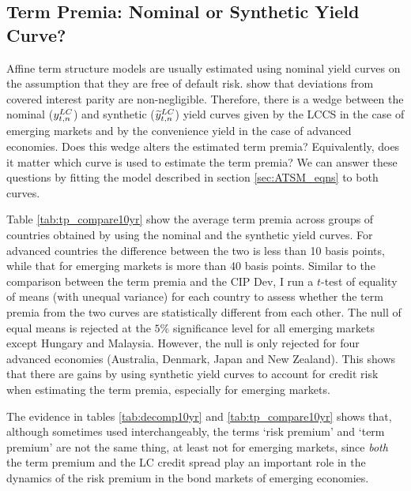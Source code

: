 \subsection{Term Premia: Nominal or Synthetic Yield Curve?}
Affine term structure models are usually estimated using nominal yield curves on the assumption that they are free of default risk. \cite{DuTepperVerdelhan:2018} show that deviations from covered interest parity are non-negligible. Therefore, there is a wedge between the nominal ($y_{t,n} ^{LC}$) and synthetic ($\widetilde{y}_{t,n} ^{LC}$) yield curves given by the LCCS in the case of emerging markets and by the convenience yield in the case of advanced economies. Does this wedge alters the estimated term premia? Equivalently, does it matter which curve is used to estimate the term premia? We can answer these questions by fitting the model described in section \ref{sec:ATSM_eqns} to both curves.

Table \ref{tab:tp_compare10yr} show the average term premia across groups of countries obtained by using the nominal and the synthetic yield curves. For advanced countries the difference between the two is less than 10 basis points, while that for emerging markets is more than 40 basis points. Similar to the comparison between the term premia and the CIP Dev, I run a $t$-test of equality of means (with unequal variance) for each country to assess whether the term premia from the two curves are statistically different from each other. The null of equal means is rejected at the $5$\% significance level for all emerging markets except Hungary and Malaysia. However, the null is only rejected for four advanced economies (Australia, Denmark, Japan and New Zealand). This shows that there are gains by using synthetic yield curves to account for credit risk when estimating the term premia, especially for emerging markets.
	

The evidence in tables \ref{tab:decomp10yr} and \ref{tab:tp_compare10yr} shows that, although sometimes used interchangeably, the terms `risk premium' and `term premium' are not the same thing, at least not for emerging markets, since \textit{both} the term premium and the LC credit spread play an important role in the dynamics of the risk premium in the bond markets of emerging economies.

